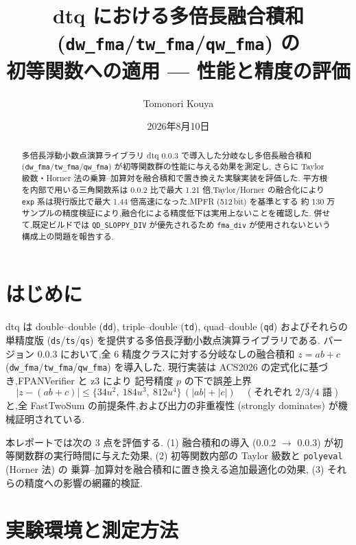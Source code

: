 \documentclass[a4paper,10pt]{ltjsarticle}
\title{dtq における多倍長融合積和 (\texttt{dw\_fma}/\texttt{tw\_fma}/\texttt{qw\_fma}) の\\
初等関数への適用 --- 性能と精度の評価}
\author{Tomonori Kouya}
\date{2026年8月10日}
\begin{document}
\maketitle

\begin{abstract}
多倍長浮動小数点演算ライブラリ dtq 0.0.3 で導入した分岐なし多倍長融合積和
(\texttt{dw\_fma}/\texttt{tw\_fma}/\texttt{qw\_fma}) が初等関数群の性能に与える効果を測定し,
さらに Taylor 級数・Horner 法の乗算--加算対を融合積和で置き換えた実験実装を評価した.
平方根を内部で用いる三角関数系は 0.0.2 比で最大 1.21 倍,Taylor/Horner の融合化により
\texttt{exp} 系は現行版比で最大 1.44 倍高速になった.MPFR (512\,bit) を基準とする
約 130 万サンプルの精度検証により,融合化による精度低下は実用上ないことを確認した.
併せて,既定ビルドでは \texttt{QD\_SLOPPY\_DIV} が優先されるため
\texttt{fma\_div} が使用されないという構成上の問題を報告する.
\end{abstract}

\section{はじめに}

dtq は double--double (\texttt{dd}), triple--double (\texttt{td}),
quad--double (\texttt{qd}) およびそれらの単精度版 (\texttt{ds}/\texttt{ts}/\texttt{qs})
を提供する多倍長浮動小数点演算ライブラリである.
バージョン 0.0.3 において,全 6 精度クラスに対する分岐なしの融合積和
$z = ab + c$ (\texttt{dw\_fma}/\texttt{tw\_fma}/\texttt{qw\_fma}) を導入した.
現行実装は ACS2026 の定式化に基づき,FPANVerifier と z3 により
記号精度 $p$ の下で誤差上界
\[ |z-(ab+c)| \le \{34u^2,\ 184u^3,\ 812u^4\}\,(|ab|+|c|) \quad (\text{それぞれ 2/3/4 語}) \]
と,全 FastTwoSum の前提条件,および出力の非重複性
(strongly dominates) が機械証明されている.

本レポートでは次の 3 点を評価する.
(1) 融合積和の導入 (0.0.2 $\to$ 0.0.3) が初等関数群の実行時間に与えた効果,
(2) 初等関数内部の Taylor 級数と \texttt{polyeval} (Horner 法) の
乗算--加算対を融合積和に置き換える追加最適化の効果,
(3) それらの精度への影響の網羅的検証.

\section{実験環境と測定方法}
\end{document}
